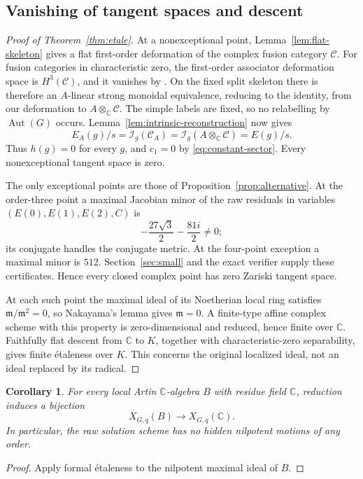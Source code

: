 \documentclass[11pt]{article}
\newtheorem{corollary}[theorem]{Corollary}
\theoremstyle{remark}
\newcommand{\C}{\mathbb C}
\newcommand{\Aut}{\operatorname{Aut}}
\begin{document}
\subsection{Vanishing of tangent spaces and descent}
\begin{proof}[Proof of Theorem~\ref{thm:etale}]
At a nonexceptional point, Lemma~\ref{lem:flat-skeleton} gives a flat
first-order deformation of the complex fusion category $\mathcal C$.
For fusion categories in characteristic zero, the first-order associator
deformation space is $H^3(\mathcal C)$, and it vanishes by
\cite[Theorem~2.27 and Section~7.1]{ENO}. On the fixed split skeleton
there is therefore an $A$-linear strong monoidal equivalence, reducing
to the identity, from our deformation to $A\otimes_\C\mathcal C$.
The simple labels are fixed, so no relabelling by $\Aut(G)$ occurs.
Lemma~\ref{lem:intrinsic-reconstruction} now gives
\[
 E_A(g)/s=\mathcal I_g(\mathcal C_A)
        =\mathcal I_g(A\otimes_\C\mathcal C)=E(g)/s.
\]
Thus $h(g)=0$ for every $g$, and $c_1=0$ by
\eqref{eq:constant-sector}. Every nonexceptional tangent space is zero.

The only exceptional points are those of Proposition~\ref{prop:alternative}.
At the order-three point a maximal Jacobian minor of the raw residuals
in variables $(E(0),E(1),E(2),C)$ is
\[
 -\frac{27\sqrt3}{2}-\frac{81i}{2}\ne0;
\]
its conjugate handles the conjugate metric. At the four-point exception
a maximal minor is $512$. Section~\ref{sec:small} and the exact verifier
supply these certificates. Hence every closed complex point has zero
Zariski tangent space.

At each such point the maximal ideal of its Noetherian local ring
satisfies $\mathfrak m/\mathfrak m^2=0$, so Nakayama's lemma gives
$\mathfrak m=0$. A finite-type affine complex scheme with this property
is zero-dimensional and reduced, hence finite over $\C$. Faithfully flat
descent from $\C$ to $K$, together with characteristic-zero separability,
gives finite \'{e}taleness over $K$. This concerns the original localized
ideal, not an ideal replaced by its radical.
\end{proof}

\begin{corollary}\label{cor:artin-lifting}
For every local Artin $\C$-algebra $B$ with residue field $\C$, reduction
induces a bijection
\[
 X_{G,q}(B)\longrightarrow X_{G,q}(\C).
\]
In particular, the raw solution scheme has no hidden nilpotent motions
of any order.
\end{corollary}
\begin{proof}
Apply formal \'{e}taleness to the nilpotent maximal ideal of $B$.
\end{proof}
\end{document}

